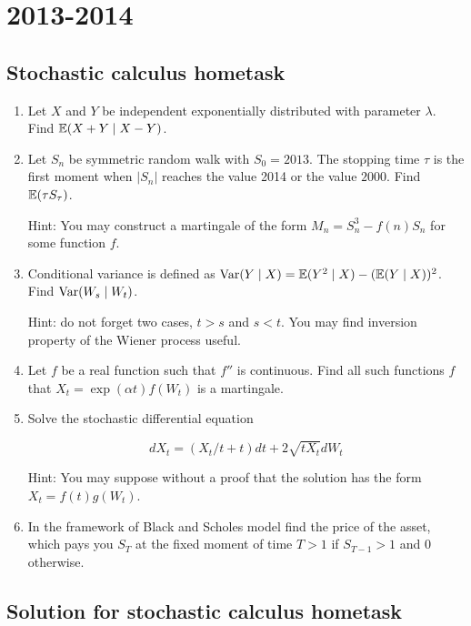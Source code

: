 \documentclass[12pt, a4paper]{article}
\begin{document}
\section{2013-2014}

\subsection{Stochastic calculus hometask}

\begin{enumerate}

\item Let $X$ and $Y$ be independent exponentially distributed with parameter $\lambda$. Find $\mathbb{E}(X+Y \mid X-Y)$.

\item Let $S_n$ be symmetric random walk with $S_0=2013$. The stopping time $\tau$ is the first moment when $|S_n|$ reaches the value 2014 or the value $2000$. Find $\mathbb{E}(\tau S_{\tau})$.

Hint: You may construct a martingale of the form $M_n=S_n^3-f(n)S_n$ for some function $f$.

\item Conditional variance is defined as $\operatorname{Var}(Y \mid X)=\mathbb{E}(Y^2 \mid X) - (\mathbb{E}(Y \mid X) )^2$. Find $\operatorname{Var}(W_s \mid W_t)$.

Hint: do not forget two cases, $t>s$ and $s<t$. You may find inversion property of the Wiener process useful.

\item Let $f$ be a real function such that $f''$ is continuous. Find all such functions $f$ that $X_t=\exp(\alpha t)f(W_t)$ is a martingale.

\item Solve the stochastic differential equation

\[
dX_t=(X_t/t+t)dt+2\sqrt{tX_t}dW_t
\]

Hint: You may suppose without a proof that the solution has the form $X_t=f(t)g(W_t)$.

\item In the framework of Black and Scholes model find the price of the asset, which pays you $S_T$ at the fixed moment of time $T>1$ if $S_{T-1}>1$ and $0$ otherwise.


\end{enumerate}

\subsection{Solution for stochastic calculus hometask}
\end{document}
